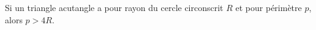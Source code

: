 Si un triangle acutangle a pour rayon du cercle circonscrit $R$ et pour périmètre $p$, alors $p > 4R$.

